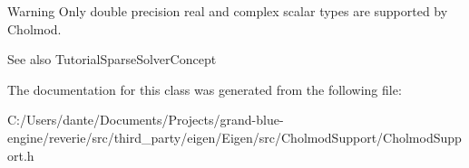 \begin{DoxyWarning}{Warning}
Only double precision real and complex scalar types are supported by Cholmod.
\end{DoxyWarning}
\begin{DoxySeeAlso}{See also}
Tutorial\+Sparse\+Solver\+Concept 
\end{DoxySeeAlso}


The documentation for this class was generated from the following file\+:\begin{DoxyCompactItemize}
\item 
C\+:/\+Users/dante/\+Documents/\+Projects/grand-\/blue-\/engine/reverie/src/third\+\_\+party/eigen/\+Eigen/src/\+Cholmod\+Support/Cholmod\+Support.\+h\end{DoxyCompactItemize}
